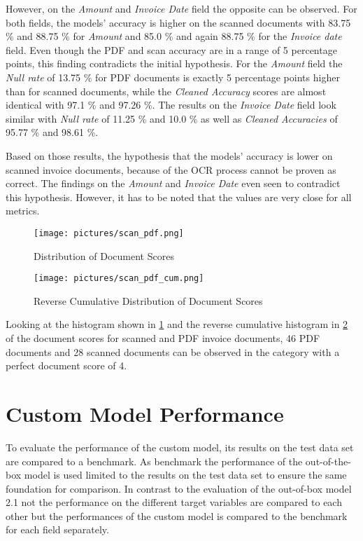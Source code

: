 However, on the \textit{Amount} and \textit{Invoice Date} field the opposite can be observed. For both fields, the models' accuracy is higher on the scanned documents  with 83.75 \% and 88.75 \% for \textit{Amount} and 85.0 \% and again 88.75 \% for the \textit{Invoice date} field. Even though the PDF and scan accuracy are in a range of 5 percentage points, this finding contradicts the initial hypothesis. For the \textit{Amount} field the \textit{Null rate} of 13.75 \% for PDF documents is exactly 5 percentage points higher than for scanned documents, while the \textit{Cleaned Accuracy} scores are almost identical with 97.1 \% and 97.26 \%. The results on the \textit{Invoice Date} field look similar with \textit{Null rate} of 11.25 \% and 10.0 \% as well as \textit{Cleaned Accuracies} of 95.77 \% and 98.61 \%.

Based on those results, the hypothesis that the models' accuracy is lower on scanned invoice documents, because of the \ac{OCR} process cannot be proven as correct. The findings on the \textit{Amount} and \textit{Invoice Date} even seen to contradict this hypothesis. However, it has to be noted that the values are very close for all metrics.

\begin{figure}[!ht]
    \centering 
    \texttt{[image: pictures/scan\_pdf.png]}
    \caption{Distribution of Document Scores}
    \label{pic:scan_pdf_1}    %
\end{figure}
\begin{figure}[!ht]
    \centering 
    \texttt{[image: pictures/scan\_pdf\_cum.png]}
    \caption{Reverse Cumulative Distribution of Document Scores}
    \label{pic:scan_pdf_1_cum}    %
\end{figure}

Looking at the histogram shown in \cref{pic:scan_pdf_1} and the reverse cumulative histogram in \cref{pic:scan_pdf_1_cum} of the document scores for scanned and PDF invoice documents, 46 PDF documents and 28 scanned documents can be observed in the category with a perfect document score of 4. 

\newpage
\section{Custom Model Performance}
To evaluate the performance of the custom model, its results on the test data set are compared to a benchmark. As benchmark the performance of the out-of-the-box model is used limited to the results on the test data set to ensure the same foundation for comparison. In contrast to the evaluation of the out-of-box model 2.1 not the performance on the different target variables are compared to each other but the performances of the custom model is compared to the benchmark for each field separately.

